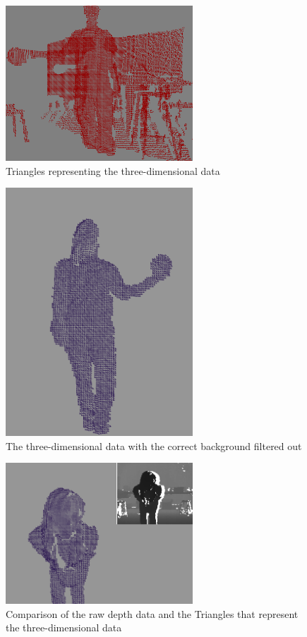 \documentclass[pdftex,10.5pt]{report}
\begin{document}
\begin{figure}[H]
	\centering
	\includegraphics[width=70mm]{figures/3dtriangles.png}
	\caption{Triangles representing the three-dimensional data}
	\label{3dtri}
\end{figure}

\begin{figure}[H]
	\centering
	\includegraphics[width=70mm]{figures/cadyholdingball.png}
	\caption{The three-dimensional data with the correct background filtered out}
	\label{balls2}
\end{figure}

\begin{figure}[H]
	\centering
	\includegraphics[width=70mm]{figures/cadyholdingball2.png}
	\caption{Comparison of the raw depth data and the Triangles that represent the three-dimensional data}
	\label{balls2}
\end{figure}
\end{document}
